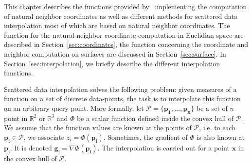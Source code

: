 This chapter describes the functions provided by \cgal\ implementing
the computation of natural neighbor coordinates as well as different
methods for scattered data interpolation most of which are based on
natural neighbor coordinates. The function for the natural neighbor 
coordinate computation in Euclidian space are described in Section~\ref{sec:coordinates}, 
the function concerning the coordinate and neighbor computation on surfaces are discussed in Section~\ref{sec:surface}. 
In Section~\ref{sec:interpolation}, we briefly describe the different interpolation functions.   

Scattered data interpolation solves the following problem: given
measures of a function on a set of discrete data-points, the task is
to interpolate this function on an arbitrary query point.
More formally, let $\mathcal{P}=\{\mathbf{p_1},\ldots ,\mathbf{p_n}\}$ be a set of
$n$ point in $\mathbb{R}^2$ or $\mathbb{R}^3$ and $\Phi$ be a scalar
function defined inside the convex hull of $\mathcal{P}$. We assume that
the function values are known at the points of $\mathcal{P}$, i.e. to
each $\mathbf{p_i} \in \mathcal{P}$, we associate $z_i =
\Phi(\mathbf{p_i})$. Sometimes, the gradient of $\Phi$ is also known
at $\mathbf{p_i}$. It is denoted $\mathbf{g_i}= \nabla
\Phi(\mathbf{p_i})$. The interpolation is carried out for a point
$\mathbf{x}$ in the convex hull of $\mathcal{P}$.

